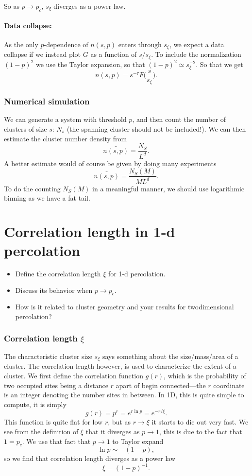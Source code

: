 \documentclass[a4paper, 11pt, notitlepage, english]{article}
\begin{document}
So as $p\to p_c$, $s_\xi$ diverges as a power law.

\paragraph{Data collapse:} As the only $p$-dependence of $n(s,p)$ enters through $s_\xi$, we expect a data collapse if we instead plot $G$ as a function of $s/s_\xi$. To include the normalization $(1-p)^2$ we use the Taylor expansion, so that $(1-p)^2 \simeq s_\xi^{-2}$. So that we get
$$n(s,p) = s^{-\tau} F\bigg(\frac{s}{s_\xi}\bigg).$$

\subsubsection*{Numerical simulation}

We can generate a system with threshold $p$, and then count the number of clusters of size $s$: $N_s$ (the spanning cluster should not be included!). We can then estimate the cluster number density from
$$\bar{n(s,p)} = \frac{N_S}{L^d}.$$
A better estimate would of course be given by doing many experiments
$$\bar{n(s,p)} = \frac{N_S(M)}{ML^d}.$$
To do the counting $N_S(M)$ in a meaningful manner, we should use logarithmic binning as we have a fat tail.

\clearpage


\section{Correlation length in 1-d percolation}
\begin{itemize}
	\item Define the correlation length $\xi$ for 1-d percolation.
	\item Discuss its behavior when $p \to p_c$. 
	\item How is it related to cluster geometry and your results for twodimensional percolation?	
\end{itemize}

\subsubsection*{Correlation length $\xi$}

The characteristic cluster size $s_\xi$ says something about the size/mass/area of a cluster. The correlation length however, is used to characterize the extent of a cluster. We first define the correlation function $g(r)$, which is the probability of two occupied sites being a distance $r$ apart of begin connected---the $r$ coordinate is an integer denoting the number sites in between. In 1D, this is quite simple to compute, it is simply
$$g(r) = p^r = e^{r \ln p} = e^{-r/\xi}.$$
This function is quite flat for low $r$, but as $r\to \xi$ it starts to die out very fast. We see from the definition of $\xi$ that it diverges as $p\to 1$, this is due to the fact that $1 = p_c$. We use that fact that $p \to 1$ to Taylor expand
$$\ln p \sim -(1-p),$$
so we find that correlation length diverges as a power law
$$\xi = (1-p)^{-1}.$$
\end{document}
